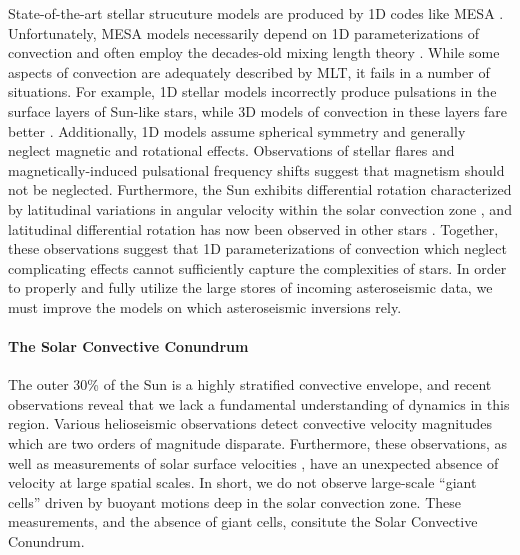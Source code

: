 \documentclass[11pt, preprint]{aastex}
\begin{document}
State-of-the-art stellar strucuture models are produced by 1D codes like MESA \citep{paxton&all2011}.
Unfortunately, MESA models necessarily depend on 1D parameterizations of convection and often employ the decades-old mixing length theory \citep[MLT,][]{bohm-vitense1958}.
While some aspects of convection are adequately described by MLT, it fails in a number of situations.
For example, 1D stellar models incorrectly produce pulsations in the surface layers of Sun-like stars, while 3D models of convection in these layers fare better \citep{jorgensen&weiss2019}.
Additionally, 1D models assume spherical symmetry and generally neglect magnetic and rotational effects.
Observations of stellar flares \citep{kowalski2016} and magnetically-induced pulsational frequency shifts \citep{santos&all2018} suggest that magnetism should not be neglected.
Furthermore, the Sun exhibits differential rotation characterized by latitudinal variations in angular velocity within the solar convection zone \citep{thompson&all1996, schou&all1998}, and latitudinal differential rotation has now been observed in other stars \citep{benomar&all2018}.
Together, these observations suggest that 1D parameterizations of convection which neglect complicating effects cannot sufficiently capture the complexities of stars.
In order to properly and fully utilize the large stores of incoming asteroseismic data, we must improve the models on which asteroseismic inversions rely.

\vspace{-0.5cm}
\paragraph{The Solar Convective Conundrum}
\label{sct:convective_conundrum}
The outer 30\% of the Sun is a highly stratified convective envelope, and recent observations reveal that we lack a fundamental understanding of dynamics in this region.
Various helioseismic observations \citep{hanasoge&all2012, greer&all2015} detect convective velocity magnitudes which are two orders of magnitude disparate.
Furthermore, these observations, as well as measurements of solar surface velocities \citep{hathaway&all2015}, have an unexpected absence of velocity at large spatial scales.
In short, we do not observe large-scale ``giant cells'' driven by buoyant motions deep in the solar convection zone.
These measurements, and the absence of giant cells, consitute the Solar Convective Conundrum.
\end{document}
